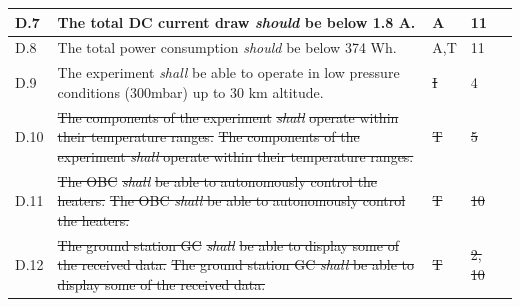 \documentclass[a4paper,12pt,twoside]{article}
\providecommand{\DIFaddtex}[1]{{\protect\color{blue}\uwave{#1}}} %
\providecommand{\DIFdeltex}[1]{{\protect\color{red}\sout{#1}}}                      %
\providecommand{\DIFaddbegin}{} %
\providecommand{\DIFaddend}{} %
\providecommand{\DIFdelbegin}{} %
\providecommand{\DIFdelend}{} %
\providecommand{\DIFadd}[1]{\texorpdfstring{\DIFaddtex{#1}}{#1}} %
\providecommand{\DIFdel}[1]{\texorpdfstring{\DIFdeltex{#1}}{}} %
\newcommand{\DIFscaledelfig}{0.5}
\newlength{\DIFdelgraphicswidth} %
\newlength{\DIFdelgraphicsheight} %
\newcommand{\DIFaddincludegraphics}[2][]{{\color{blue}\fbox{\DIFOincludegraphics[#1]{#2}}}} %
\newcommand{\DIFdelincludegraphics}[2][]{%
\sbox{\DIFdelgraphicsbox}{\DIFOincludegraphics[#1]{#2}}%
\settoboxwidth{\DIFdelgraphicswidth}{\DIFdelgraphicsbox} %
\settoboxtotalheight{\DIFdelgraphicsheight}{\DIFdelgraphicsbox} %
\scalebox{\DIFscaledelfig}{%
\parbox[b]{\DIFdelgraphicswidth}{\usebox{\DIFdelgraphicsbox}\\[-\baselineskip] \rule{\DIFdelgraphicswidth}{0em}}\llap{\resizebox{\DIFdelgraphicswidth}{\DIFdelgraphicsheight}{%
\setlength{\unitlength}{\DIFdelgraphicswidth}%
\begin{picture}(1,1)%
\thicklines\linethickness{2pt} %
{\color[rgb]{1,0,0}\put(0,0){\framebox(1,1){}}}%
{\color[rgb]{1,0,0}\put(0,0){\line( 1,1){1}}}%
{\color[rgb]{1,0,0}\put(0,1){\line(1,-1){1}}}%
\end{picture}%
}\hspace*{3pt}}} %
} %
\DeclareRobustCommand{\DIFaddbegin}{\DIFOaddbegin \let\includegraphics\DIFaddincludegraphics} %
\DeclareRobustCommand{\DIFaddend}{\DIFOaddend \let\includegraphics\DIFOincludegraphics} %
\DeclareRobustCommand{\DIFdelbegin}{\DIFOdelbegin \let\includegraphics\DIFdelincludegraphics} %
\DeclareRobustCommand{\DIFdelend}{\DIFOaddend \let\includegraphics\DIFOincludegraphics} %
\begin{document}
\begin{longtable}[]{|m{}| m{} |m{} |m{}|m{}|}
D.7  & The total DC current draw \textit{should} be below 1.8 A.                                                                                                                        &      A\DIFaddbegin \DIFadd{, T        }\DIFaddend & 11            &        \\ \hline
D.8  & The total power consumption \textit{should} be below 374 Wh.                                                                                                                      &       A,T       & 11            &        \\ \hline
D.9  & The experiment \textit{shall} be able to operate in low pressure conditions (300mbar) up to 30 km altitude.                                                                                       &      \DIFdelbegin \DIFdel{I        }\DIFdelend \DIFaddbegin \DIFadd{A, T        }\DIFaddend &  4\DIFaddbegin \DIFadd{, 18           }\DIFaddend &        \\ \hline
D.10 & \DIFdelbegin \DIFdel{The components of the experiment }\textit{\DIFdel{shall}} %
\DIFdel{operate within their temperature ranges.                                                                                         }\DIFdelend \DIFaddbegin \st{The components of the experiment \textit{shall} operate within their temperature ranges.}\DIFadd{\textsuperscript{\ref{fn:unnecessary-requirement}}                                                                                          }\DIFaddend &       \DIFdelbegin \DIFdel{T       }\DIFdelend \DIFaddbegin \DIFadd{-     }\DIFaddend & \DIFdelbegin \DIFdel{5            }\DIFdelend \DIFaddbegin \DIFadd{-           }\DIFaddend &        \\  \hline
D.11 & \DIFdelbegin \DIFdel{The OBC }\textit{\DIFdel{shall}} %
\DIFdel{be able to autonomously control the heaters.                                                                                                              }\DIFdelend \DIFaddbegin \st{The OBC \textit{shall} be able to autonomously control the heaters.}\DIFadd{\textsuperscript{\ref{fn:unnecessary-requirement}}                                                                                                               }\DIFaddend &        \DIFdelbegin \DIFdel{T     }\DIFdelend \DIFaddbegin \DIFadd{-    }\DIFaddend &  \DIFdelbegin \DIFdel{10            }\DIFdelend \DIFaddbegin \DIFadd{-            }\DIFaddend &        \\ \hline
D.12 & \DIFdelbegin \DIFdel{The ground station GC }\textit{\DIFdel{shall}} %
\DIFdel{be able to display some of the received data.                                                                                               }\DIFdelend \DIFaddbegin \st{The ground station GC \textit{shall} be able to display some of the received data.}\DIFadd{\textsuperscript{\ref{fn:unnecessary-requirement}}                                                                                                }\DIFaddend &      \DIFdelbegin \DIFdel{T        }\DIFdelend \DIFaddbegin \DIFadd{-       }\DIFaddend & \DIFdelbegin \DIFdel{2, 10            }\DIFdelend \DIFaddbegin \DIFadd{-           }\DIFaddend &        \\ \hline

\end{longtable}
\end{document}
